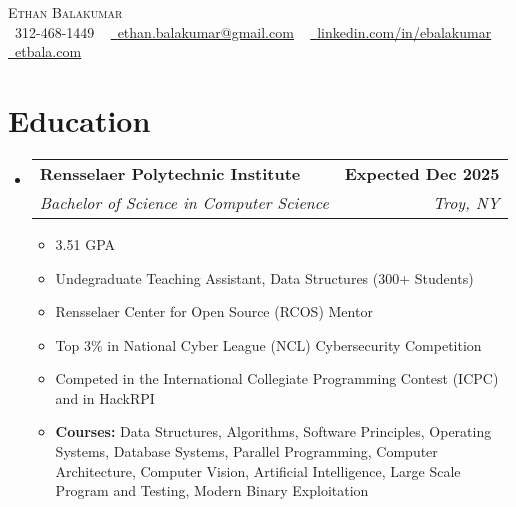 \documentclass[letterpaper,11pt]{article}
\makeatletter
\newcommand{\resumeItem}[1]{
    \item\small{
        {#1 \vspace{-2pt}}
    }
}
\newcommand{\resumeSubheading}[4]{
    \vspace{-2pt}\item
        \begin{tabular*}{1.0\textwidth}[t]{l@{\extracolsep{\fill}}r}
            \textbf{#1} & \textbf{\small #2} \\
            \textit{\small#3} & \textit{\small #4} \\
        \end{tabular*}\vspace{-3pt}
}
\newcommand{\resumeSubHeadingListStart}{\begin{itemize}[leftmargin=0.0in, label={}]}
\newcommand{\resumeSubHeadingListEnd}{\end{itemize}}
\newcommand{\resumeItemListStart}{\begin{itemize}\vspace{-2pt}}
\newcommand{\resumeItemListEnd}{\end{itemize}\vspace{-2pt}}
\newcommand\skippar[1]{\par#1\par\vspace{-\parskip}}
\makeatother
\begin{document}
\begin{center}
    \skippar{
    {\Huge \scshape \fontsize{28pt}{32pt}\selectfont Ethan \textcolor{accent}{Balakumar}} \\ \vspace{1pt}
    \small \textcolor{accent}{\raisebox{-0.1\height}\faPhone}\ 312-468-1449 ~ 
    \href{mailto:ethan.balakumar@gmail.com}{\textcolor{accent}{\raisebox{-0.2\height}\faEnvelope}\ \underline{ethan.balakumar@gmail.com}} ~ 
    \href{https://linkedin.com/in/ebalakumar/}{\textcolor{accent}{\raisebox{-0.2\height}\faLinkedin}\ \underline{linkedin.com/in/ebalakumar}} ~ 
    \href{https://etbala.com}{\textcolor{accent}{\raisebox{-0.2\height}\faLink}\ \underline{etbala.com}} ~ 
    }
    \vspace{-8pt}
\end{center}

\begin{comment}
\section{Profile}
Profile text here...
\end{comment}

\section{\textcolor{accent}{Education}}
    \resumeSubHeadingListStart
        \resumeSubheading
            {Rensselaer Polytechnic Institute}{Expected Dec 2025}
            {Bachelor of Science in Computer Science}{Troy, NY}
            \resumeItemListStart
                \resumeItem{3.51 GPA}
                \resumeItem{Undegraduate Teaching Assistant, Data Structures (300+ Students)}
                \resumeItem{Rensselaer Center for Open Source (RCOS) Mentor}
                \resumeItem{Top 3\% in National Cyber League (NCL) Cybersecurity Competition}
                \resumeItem{Competed in the International Collegiate Programming Contest (ICPC) and in HackRPI}
                \resumeItem{\textbf{Courses:} Data Structures, Algorithms, Software Principles, Operating Systems, Database Systems, Parallel Programming, Computer Architecture, Computer Vision, Artificial Intelligence, Large Scale Program and Testing, Modern Binary Exploitation}
            \resumeItemListEnd
    \resumeSubHeadingListEnd
\vspace{-12pt}
\end{document}
